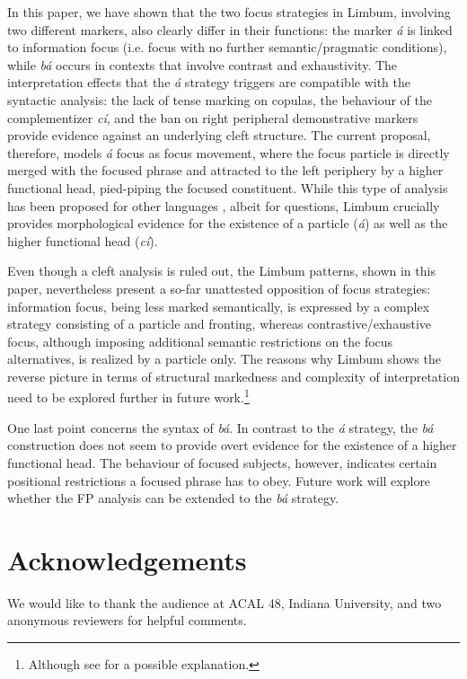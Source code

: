 \documentclass[output=paper,
modfonts
]{langscibook}
\begin{document}
In this paper, we have shown that the two focus strategies in Limbum, involving two different markers, also clearly differ in their functions: the marker \textit{á} is linked to information focus (i.e. focus with no further semantic/pragmatic conditions), while \textit{bá} occurs in contexts that involve contrast and exhaustivity. The interpretation effects that the {\em \'a} strategy triggers are compatible with the syntactic analysis: the lack of tense marking on copulas, the behaviour of the complementizer \textit{cí}, and the ban on right peripheral demonstrative markers provide evidence against an underlying cleft structure. The current proposal, therefore, models {\em\'a} focus as focus movement, where the focus particle is directly merged with the focused phrase and attracted to the left periphery by a higher functional head, pied-piping the focused constituent. While this type of analysis has been proposed for other languages \citep{Hagstrom1998,Cable2010}, albeit for questions, Limbum crucially provides morphological evidence for the existence of a particle (\textit{\'a}) as well as the higher functional head (\textit{c\'i}).

Even though a cleft analysis is ruled out, the Limbum patterns, shown in this paper, nevertheless present a so-far unattested opposition of focus strategies: information focus, being less marked semantically, is expressed by a complex strategy consisting of a particle and fronting, whereas contrastive/exhaustive focus, although imposing additional semantic restrictions on the focus alternatives, is realized by a particle only. The reasons why Limbum shows the reverse picture in terms of structural markedness and complexity of interpretation need to be explored further in future work.\footnote{Although see \citet{Driemeletal2018} for a possible explanation.}

One last point concerns the syntax of {\em b\'a}. In contrast to the {\em \'a} strategy, the {\em b\'a} construction does not seem to provide overt evidence for the existence of a higher functional head. The behaviour of focused subjects, however, indicates certain positional restrictions a focused phrase has to obey. Future work will explore whether the FP analysis can be extended to the {\em b\'a} strategy.

\section*{Acknowledgements}
We would like to thank the audience at ACAL 48, Indiana University, and two anonymous reviewers for helpful comments.
\end{document}
